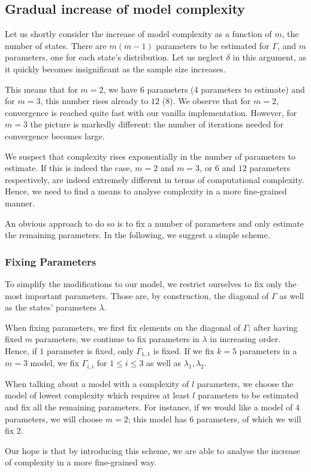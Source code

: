 \subsection{Gradual increase of model complexity}

Let us shortly consider the increase of model complexity as a function of $m$, the number of states. There are $m (m-1)$ parameters to be estimated for $\Gamma$, and $m$ parameters, one for each state's distribution. Let us neglect $\delta$ in this argument, as 
it quickly becomes insignificant as the sample size increases. 

This means that for $m=2$, we have $6$ parameters (4 parameters to estimate) and for $m=3$, this number rises already to $12$ (8). We observe that for $m=2$, convergence is reached quite fast with our vanilla implementation. However, for $m=3$ the picture is markedly different: the number of iterations needed for convergence becomes large.
 
We suspect that complexity rises exponentially in the number of parameters to estimate. If this is indeed the case, $m=2$ and $m=3$, or $6$ and $12$ parameters respectively, are indeed extremely different in terms of computational complexity. Hence, we need to find a means to analyse complexity in a more fine-grained manner. 


An obvious approach to do so is to fix a number of parameters and only estimate the remaining parameters.  In the following, we suggest a simple scheme. 


\subsubsection{Fixing Parameters}
To simplify the modifications to our model, we restrict ourselves to fix only the most important parameters. Those are, by construction, the diagonal of $\Gamma$ as well as the states' parameters $\lambda$. 

When fixing parameters, we first fix elements on the diagonal of $\Gamma$; after having fixed $m$ parameters, we continue to fix parameters in $\lambda$ in increasing order. Hence, if $1$ parameter is fixed, only $\Gamma_{1,1}$ is fixed. If we fix $k=5$ parameters in a $m=3$ model, we fix $\Gamma_{i, i}$ for $1 \leq i \leq 3$ as well as $\lambda_1, \lambda_2$.

When talking about a model with a complexity of $l$ parameters, we choose the model of lowest complexity which requires at least $l$ parameters to be estimated and fix all the remaining parameters. For instance,  if we would like a model of $4$ parameters, we will choose $m=2$; this model has $6$ parameters, of which we will fix $2$. 

Our hope is that by introducing this scheme, we are able to analyse the increase of complexity in a more fine-grained way. 
